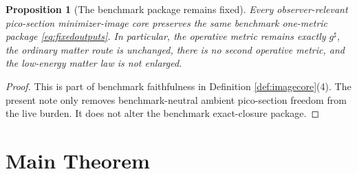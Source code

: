 \documentclass[11pt]{article}
\newcommand{\CompletedMetric}{g^{\sharp}}
\newtheorem{proposition}{Proposition}
\begin{document}
\begin{proposition}[The benchmark package remains fixed]
\label{prop:benchmark}
Every observer-relevant pico-section minimizer-image core preserves the same benchmark one-metric package \eqref{eq:fixedoutputs}. In particular, the operative metric remains exactly \(\CompletedMetric\), the ordinary matter route is unchanged, there is no second operative metric, and the low-energy matter law is not enlarged.
\end{proposition}

\begin{proof}
This is part of benchmark faithfulness in Definition \ref{def:imagecore}(4). The present note only removes benchmark-neutral ambient pico-section freedom from the live burden. It does not alter the benchmark exact-closure package.
\end{proof}

\section{Main Theorem}
\end{document}
